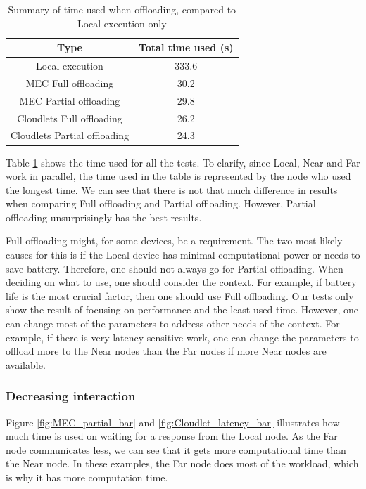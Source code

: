 \begin{table}[]
    \centering
    \begin{tabular}{c|c}

       Type  & Total time used (s)\\
       \hline

       Local execution                         & 333.6  \\

       MEC Full offloading       & 30.2 \\

       MEC Partial offloading    & 29.8 \\

       Cloudlets Full offloading & 26.2 \\
 
       Cloudlets Partial offloading  & 24.3 \\

    \end{tabular}
    \caption{Summary of time used when offloading, compared to Local execution only}
    \label{tab:total_time_compare}
\end{table}
Table \ref{tab:total_time_compare} shows the time used for all the tests. To clarify, since Local, Near and Far work in parallel, the time used in the table is represented by the node who used the longest time. We can see that there is not that much difference in results when comparing Full offloading and Partial offloading. However, Partial offloading unsurprisingly has the best results.

Full offloading might, for some devices, be a requirement. The two most likely causes for this is if the Local device has minimal computational power or needs to save battery. Therefore, one should not always go for Partial offloading. When deciding on what to use, one should consider the context. For example, if battery life is the most crucial factor, then one should use Full offloading. Our tests only show the result of focusing on performance and the least used time. However, one can change most of the parameters to address other needs of the context. For example, if there is very latency-sensitive work, one can change the parameters to offload more to the Near nodes than the Far nodes if more Near nodes are available.



\subsubsection{Decreasing interaction}
Figure \ref{fig:MEC_partial_bar} and \ref{fig:Cloudlet_latency_bar} illustrates how much time is used on waiting for a response from the Local node. As the Far node communicates less, we can see that it gets more computational time than the Near node. In these examples, the Far node does most of the workload, which is why it has more computation time.


